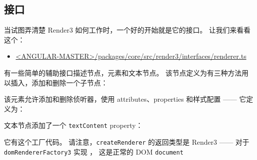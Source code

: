 \subsection{接口}


当试图弄清楚 Render3 如何工作时，一个好的开始就是它的接口。
让我们来看看这个：

\begin{itemize}
  \item \href{https://github.com/angular/angular/blob/master/packages/core/src/render3/interfaces/renderer.ts}
        {<ANGULAR-MASTER>/packages/core/src/render3/interfaces/renderer.ts}
\end{itemize}


有一些简单的辅助接口描述节点，元素和文本节点。
该节点定义为有三种方法用以插入，添加和删除一个子节点：




该元素允许添加和删除侦听器，使用 attributes、properties 和样式配置 —— 它定义为：




文本节点添加了一个 \texttt{textContent} property：




它有这个工厂代码。
请注意，\texttt{createRenderer} 的返回类型是 Render3  —— 对于 \texttt{domRendererFactory3} 实现 ，
这是正常的 DOM \texttt{document}

